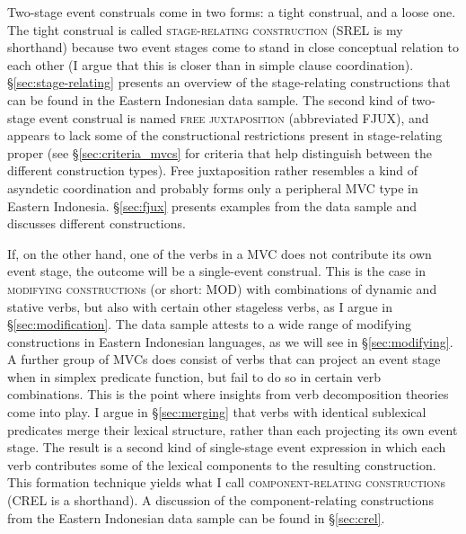 Two-stage event construals come in two forms: a tight construal, and a loose one. The tight construal is called \textsc{stage-relating construction} (SREL is my shorthand) because two event stages come to stand in close conceptual relation to each other (I argue that this is closer than in simple clause coordination). §\ref{sec:stage-relating} presents an overview of the stage-relating constructions that can be found in the Eastern Indonesian data sample. The second kind of two-stage event construal is named \textsc{free juxtaposition} (abbreviated FJUX), and appears to lack some of the constructional restrictions present in stage-relating proper (see §\ref{sec:criteria_mvcs} for criteria that help distinguish between the different construction types). Free juxtaposition rather resembles a kind of asyndetic coordination and probably forms only a peripheral MVC type in Eastern Indonesia. §\ref{sec:fjux} presents examples from the data sample and discusses different constructions.

If, on the other hand, one of the verbs in a MVC does not contribute its own event stage, the outcome will be a single-event construal. This is the case in \textsc{modifying construction}s (or short: MOD) with combinations of dynamic and stative verbs, but also with certain other stageless verbs, as I argue in §\ref{sec:modification}. The data sample attests to a wide range of modifying constructions in Eastern Indonesian languages, as we will see in §\ref{sec:modifying}. A further group of MVCs does consist of verbs that can project an event stage when in simplex predicate function, but fail to do so in certain verb combinations. This is the point where insights from verb decomposition theories come into play. I argue in §\ref{sec:merging} that verbs with identical sublexical predicates merge their lexical structure, rather than each projecting its own event stage. The result is a second kind of single-stage event expression in which each verb contributes some of the lexical components to the resulting construction. This formation technique yields what I call \textsc{component-relating construction}s (CREL is a shorthand). A discussion of the component-relating constructions from the Eastern Indonesian data sample can be found in §\ref{sec:crel}.

